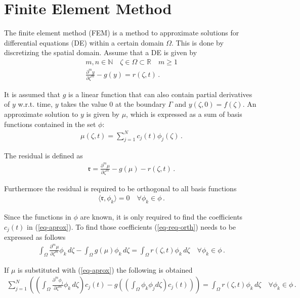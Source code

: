 \section{Finite Element Method} \label{FEM}
The finite element method (FEM) is a method to approximate solutions for differential equations (DE) within a certain domain \(\Omega\).
This is done by discretizing the spatial domain.
Assume that a DE is given by
\begin{gather}
m, n \in \mathbb{N} \quad \zeta \in \Omega \subset \mathbb{R} \quad m \geq 1 \\
\frac{\partial^{m} y}{\partial \zeta^{m}} -  g(y) = r(\zeta, t) \,. \label{eq-pde-gen} 
\end{gather}


It is assumed that \(g\) is a linear function that can also contain partial derivatives of \(y\) w.r.t. time, \(y\) takes the value 0 at the boundary \(\Gamma\) and \(y(\zeta, 0) = f(\zeta)\).
An approximate solution to \(y\) is given by \(\mu\), which is expressed as a sum of basis functions contained in the set \(\phi\):
\begin{gather}
\mu(\zeta, t) = \sum_{j = 1}^{N} c_{j}(t)\phi_{j}(\zeta) \,. \label{eq-aprox}
\end{gather}


The residual is defined as
\begin{gather}
\mathfrak{r} = \frac{\partial^{m} \mu}{\partial \zeta^{m}} -  g(\mu) - r(\zeta, t) \,.
\end{gather}


Furthermore the residual is required to be orthogonal to all basis functions
\begin{gather}
\langle \mathfrak{r}, \phi_{k} \rangle = 0 \quad \forall \phi_{k} \in \phi \,. \label{eq-req-orth}
\end{gather}


Since the functions in \(\phi\) are known, it is only required to find the coefficients \(c_{j}(t)\) in (\ref{eq-aprox}).
To find those coefficients (\ref{eq-req-orth}) needs to be expressed as follows
\begin{gather}
\int_{\Omega} \frac{\partial^{m} \mu}{\partial \zeta^{m}} \phi_{k} \, d\zeta  -  \int_{\Omega} g(\mu) \phi_{k}        \, d\zeta = \int_{\Omega}  r(\zeta, t) \phi_{k}        \, d\zeta \quad \forall \phi_{k} \in \phi \,. 
\end{gather}


If \(\mu\) is substituted with (\ref{eq-aprox}) the following is obtained
\begin{gather}
\sum_{j = 1}^{N} \left( \left( \int_{\Omega} \frac{\partial^{m} \phi_{j}}{\partial \zeta^{m}} \phi_{k} \, d\zeta\right) c_{j}(t) - g\left( \left(\int_{\Omega} \phi_k \phi_j d\zeta\right) c_{j}(t)\right) \right)  = \int_{\Omega}  r(\zeta, t) \phi_{k}        \, d\zeta \quad \forall \phi_{k} \in \phi \,. \label{eq-al}
\end{gather}


